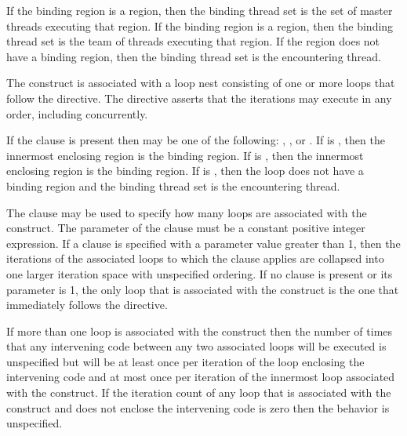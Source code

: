 If the binding region is a  region, then the binding thread set is
the set of master threads executing that region. If the binding region is a
 region, then the binding thread set is the team of threads
executing that region. If the  region does not have a binding
region, then the binding thread set is the encountering thread.



\descr

The  construct is associated with a loop nest consisting of one or
more loops that follow the directive. The directive asserts that the iterations
may execute in any order, including concurrently.

If the  clause is present then  may be one of
the following: , , or . If
 is , then the innermost enclosing
 region is the binding region.  If  is
, then the innermost enclosing  region is the
binding region. If  is , then the loop does not have
a binding region and the binding thread set is the encountering thread.


The  clause may be used to specify how many loops are associated
with the  construct. The parameter of the  clause
must be a constant positive integer expression. If a  clause is
specified with a parameter value greater than 1, then the iterations of the
associated loops to which the clause applies are collapsed into one larger
iteration space with unspecified ordering. If no  clause is
present or its parameter is 1, the only loop that is associated with the
 construct is the one that immediately follows the 
directive.

If more than one loop is associated with the  construct then the
number of times that any intervening code between any two associated
loops will be executed is unspecified but will be at least once per
iteration of the loop enclosing the intervening code and at most once
per iteration of the innermost loop associated with the construct. If the
iteration count of any loop that is associated with the  construct and does not
enclose the intervening code is zero then the behavior is unspecified.

